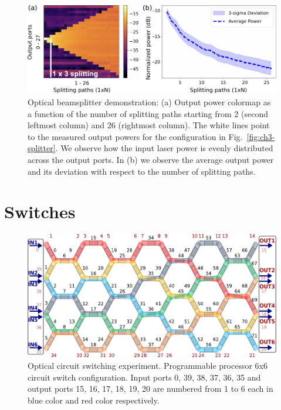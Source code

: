 \begin{figure}
	\begin{center}
		\includegraphics{figures/ch3-splitters_power_meter.pdf}
	\end{center}
	\caption{Optical beamsplitter demonstration: (a) Output power colormap as a function of
		the number of splitting paths starting from 2 (second leftmost column) and 26 (rightmost column).
		The white lines point to the measured output powers for the configuration in Fig.~\ref{fig:ch3-splitter}.
		We observe how the input laser power is evenly distributed across the output ports.
		In (b) we observe the average output power and its deviation with respect to the number of splitting paths.
	}\label{fig:ch3-splitters_power_meter}
\end{figure}


\section{Switches}\label{sec:switches} %

\begin{figure}
	\begin{center}
		\includegraphics{figures/ch3-ocs.pdf}
	\end{center}
	\caption{Optical circuit switching experiment.
		Programmable processor 6x6 circuit switch configuration.
		Input ports 0, 39, 38, 37, 36, 35 and output ports 15, 16, 17, 18, 19, 20 are numbered from 1 to 6 each in blue color and red color respectively.
	}\label{fig:ch3-ocs}
\end{figure}

